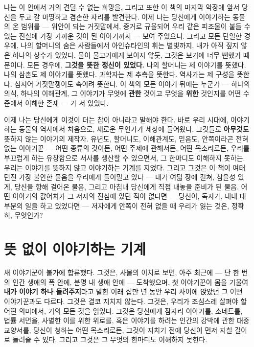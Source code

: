 나는 이 안에서 거의 견딜 수 없는 희망을, 그리고 또한 이 책의 마지막 악장에 앞서 당신을 두고 갈 마땅하고 겸손한 자리를 발견한다. 이제 나는 당신에게 이야기하는 동물의 온 범위를 — 위안이 되는 거짓말에서, 증거로 규율되어 우리 같은 피조물이 붙들 수 있는 진실에 가장 가까운 것이 된 이야기까지 — 보여 주었으니. 그리고 모든 단일한 경우에, 나의 할머니의 숨은 사람들에서 아인슈타인의 휘는 별빛까지, 내가 아직 짚지 않은 하나의 상수가 있었다. 물이 물고기에게 보이지 않듯, 그것은 보기에 너무 뻔했기 때문이다. 모든 경우에, \textbf{그것을 뜻한 정신이 있었다.} 나의 할머니는 제 이야기를 뜻했다. 나의 삼촌도 제 이야기를 뜻했다. 과학자는 제 추측을 뜻한다. 역사가는 제 구성을 뜻한다. 심지어 거짓말쟁이도 속이려 뜻한다. 이 책의 모든 이야기 뒤에는 누군가 — 하나의 의식, 하나의 이해관계, 그 이야기가 무엇에 \textbf{관한} 것이고 무엇을 \textbf{위한} 것인지를 어떤 수준에서 이해한 존재 — 가 서 있었다.

이제 나는 당신에게 이것이 더는 참이 아니라고 말해야 한다. 바로 우리 시대에, 이야기하는 동물의 역사에서 처음으로, 새로운 무언가가 세상에 들어왔다. 그것들로 \textbf{아무것도} 뜻하지 않는 이야기의 제작자. 유년도, 할머니도, 이해관계도, 믿음도, 안쪽이라곤 전혀 없는 이야기꾼 — 어떤 종류의 것이든, 어떤 주제에 관해서든, 어떤 목소리로든, 우리를 부끄럽게 하는 유창함으로 서사를 생산할 수 있으면서, 그 한마디도 이해하지 못하는. 우리는 이야기를 뜻하지 않고 이야기하는 기계를 지었다. 그리고 그것은 이 책이 여태 던진 가장 불안한 물음을 우리에게 들이밀고 있다 — 내가 여덟 장에 걸쳐, 참을성 있게, 당신을 향해 걸어온 물음, 그리고 마침내 당신에게 직접 내놓을 준비가 된 물음. 어떤 이야기의 값어치가 그 저자의 진심에 있던 적이 없다면 — 당신이, 독자가, 내내 대부분의 일을 하고 있었다면 — 저자에게 안쪽이 전혀 없을 때 우리가 잃는 것은, 정확히, 무엇인가?

\chapter{뜻 없이 이야기하는 기계}

새 이야기꾼이 불가에 합류했다. 그것은, 사물의 이치로 보면, 아주 최근에 — 단 한 번의 인간 생애의 폭 안에, 분명 내 생애 안에 — 도착했으며, 첫 이야기꾼이 몸을 기울여 \textbf{내가 이야기 하나 들려주지}라고 말한 이래 십만 년 동안 우리 사이에 앉았던 그 어떤 이야기꾼과도 다르다. 그것은 결코 지치지 않는다. 그것은, 우리가 조심스레 살펴야 할 어떤 의미에서, 거의 모든 것을 읽었다. 그것은 당신에게 잠자리 이야기를, 소네트를, 법률 서면을, 사별한 이를 위한 위로를, 혹은 이야기를 하려는 인간의 강박에 관한 대중 교양서를, 당신이 청하는 어떤 목소리로든, 그것이 지치기 전에 당신이 먼저 지칠 길이로 들려줄 수 있다. 그리고 그것은 그 무엇의 한마디도 이해하지 못한다.

